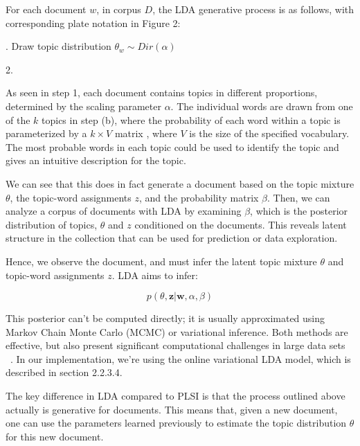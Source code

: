 \documentclass[12pt]{report}
\begin{document}
For each document $w$, in corpus $D$, the LDA generative process is as follows, 
with corresponding plate notation in Figure 2:

\begin{algorithm}[H]
. Draw topic distribution $\theta_w \sim Dir(\alpha)$

2. 
\end{algorithm}

As seen in step 1, each document contains topics in different proportions,
determined by the scaling parameter $\alpha$. The individual words are drawn
from one of the $k$ topics in step (b), where the probability of each word
within a topic is parameterized by a $k \times V$ matrix , where $V$ is the
size of the specified vocabulary. The most probable words in each topic could
be used to identify the topic and gives an intuitive description for the topic.

We can see that this does in fact generate a document based on the topic 
mixture $\theta$, the topic-word assignments $z$, and the probability 
matrix $\beta$. Then, we can analyze a corpus of documents with LDA by 
examining $\beta$, which is the posterior distribution of topics, $\theta$ 
and $z$ conditioned on the documents. This reveals latent structure in
the collection that can be used for prediction or data exploration. 

Hence, we observe the document, and must infer the latent topic mixture 
$\theta$ and topic-word assignments $z$. LDA aims to infer:

\begin{equation}
p(\theta, \textbf{z} |\textbf{w}, \alpha, \beta)
\end{equation}

This
posterior can't be computed directly; it is usually approximated using Markov
Chain Monte Carlo (MCMC) or variational inference. Both methods are effective,
but also present significant computational challenges in large data sets
~\cite{onlineLDAvb}. In our implementation, we're using the online variational
LDA model, which is described in section 2.2.3.4.
 
The key difference in LDA compared to PLSI is that the process outlined above
actually is generative for documents. This means that, given a new document,
one can use the parameters learned previously to estimate the topic
distribution $\theta$ for this new document.
 
\end{document}
